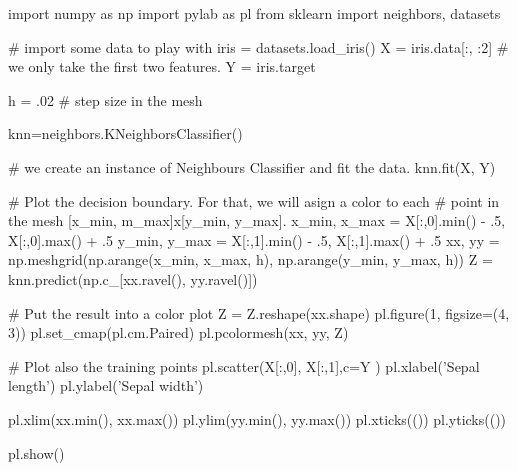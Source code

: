 \documentclass[a4pper,11pt,onecolumn]{article}
\begin{document}
\begin{python}
	import numpy as np
	import pylab as pl
	from sklearn import neighbors, datasets
	
	# import some data to play with
	iris = datasets.load_iris()
	X = iris.data[:, :2] # we only take the first two features. 
	Y = iris.target
	
	
	h = .02 # step size in the mesh
	
	knn=neighbors.KNeighborsClassifier()
	
	# we create an instance of Neighbours Classifier and fit the data.
	knn.fit(X, Y)
	
	# Plot the decision boundary. For that, we will asign a color to each
	# point in the mesh [x_min, m_max]x[y_min, y_max].
	x_min, x_max = X[:,0].min() - .5, X[:,0].max() + .5
	y_min, y_max = X[:,1].min() - .5, X[:,1].max() + .5
	xx, yy = np.meshgrid(np.arange(x_min, x_max, h), np.arange(y_min, y_max, h))
	Z = knn.predict(np.c_[xx.ravel(), yy.ravel()])
	
	# Put the result into a color plot
	Z = Z.reshape(xx.shape)
	pl.figure(1, figsize=(4, 3))
	pl.set_cmap(pl.cm.Paired)
	pl.pcolormesh(xx, yy, Z)
	
	# Plot also the training points
	pl.scatter(X[:,0], X[:,1],c=Y )
	pl.xlabel('Sepal length')
	pl.ylabel('Sepal width')
	
	pl.xlim(xx.min(), xx.max())
	pl.ylim(yy.min(), yy.max())
	pl.xticks(())
	pl.yticks(())
	
	pl.show()	
\end{python}
\end{document}
